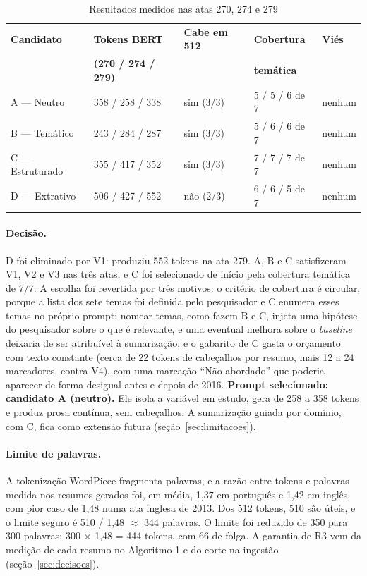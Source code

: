 \documentclass[12pt]{article}
\begin{document}
\begin{table}[ht]
\centering
\caption{Resultados medidos nas atas 270, 274 e 279}
\label{tab:prompt_resultados}
\begin{tabular}{|l|l|l|l|l|}
\hline
\textbf{Candidato} & \textbf{Tokens BERT} & \textbf{Cabe em 512} &
\textbf{Cobertura} & \textbf{Viés} \\
 & \textbf{(270 / 274 / 279)} & & \textbf{temática} & \\
\hline
A --- Neutro & 358 / 258 / 338 & sim (3/3) & 5 / 5 / 6 de 7 & nenhum \\
\hline
B --- Temático & 243 / 284 / 287 & sim (3/3) & 5 / 6 / 6 de 7 & nenhum \\
\hline
C --- Estruturado & 355 / 417 / 352 & sim (3/3) & 7 / 7 / 7 de 7 & nenhum \\
\hline
D --- Extrativo & 506 / 427 / 552 & não (2/3) & 6 / 6 / 5 de 7 & nenhum \\
\hline
\end{tabular}
\end{table}

\paragraph{Decisão.} D foi eliminado por V1: produziu 552 tokens na ata 279. A,
B e C satisfizeram V1, V2 e V3 nas três atas, e C foi selecionado de início pela
cobertura temática de 7/7. A escolha foi revertida por três motivos: o critério
de cobertura é circular, porque a lista dos sete temas foi definida pelo
pesquisador e C enumera esses temas no próprio prompt; nomear temas, como fazem
B e C, injeta uma hipótese do pesquisador sobre o que é relevante, e uma
eventual melhora sobre o \textit{baseline} deixaria de ser atribuível à
sumarização; e o gabarito de C gasta o orçamento com texto constante (cerca de
22 tokens de cabeçalhos por resumo, mais 12 a 24 marcadores, contra V4), com uma
marcação ``Não abordado'' que poderia aparecer de forma desigual antes e depois
de 2016.
\textbf{Prompt selecionado: candidato A (neutro).} Ele isola a variável em
estudo, gera de 258 a 358 tokens e produz prosa contínua, sem cabeçalhos. A
sumarização guiada por domínio, com C, fica como extensão futura
(seção~\ref{sec:limitacoes}).

\paragraph{Limite de palavras.} A tokenização WordPiece fragmenta palavras, e a
razão entre tokens e palavras medida nos resumos gerados foi, em média, 1,37 em
português e 1,42 em inglês, com pior caso de 1,48 numa ata inglesa de 2013. Dos
512 tokens, 510 são úteis, e o limite seguro é 510 / 1,48 $\approx$ 344
palavras. O limite foi reduzido de 350 para 300 palavras: 300 $\times$ 1,48 = 444
tokens, com 66 de folga. A garantia de R3 vem da medição de cada resumo no
Algoritmo 1 e do corte na ingestão (seção~\ref{sec:decisoes}).
\end{document}

